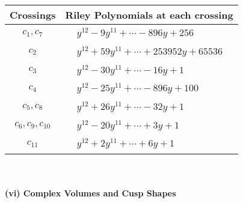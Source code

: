 \documentclass[1p]{elsarticle_modified}
\theoremstyle{definition}
\begin{document}
\begin{tabular}{m{50pt}|m{274pt}}
Crossings & \hspace{64pt}Riley Polynomials at each crossing \\
\hline $$\begin{aligned}c_{1},c_{7}\end{aligned}$$&$\begin{aligned}
&y^{12}-9 y^{11}+\cdots-896 y+256
\end{aligned}$\\
\hline $$\begin{aligned}c_{2}\end{aligned}$$&$\begin{aligned}
&y^{12}+59 y^{11}+\cdots+253952 y+65536
\end{aligned}$\\
\hline $$\begin{aligned}c_{3}\end{aligned}$$&$\begin{aligned}
&y^{12}-30 y^{11}+\cdots-16 y+1
\end{aligned}$\\
\hline $$\begin{aligned}c_{4}\end{aligned}$$&$\begin{aligned}
&y^{12}-25 y^{11}+\cdots-896 y+100
\end{aligned}$\\
\hline $$\begin{aligned}c_{5},c_{8}\end{aligned}$$&$\begin{aligned}
&y^{12}+26 y^{11}+\cdots-32 y+1
\end{aligned}$\\
\hline $$\begin{aligned}c_{6},c_{9},c_{10}\end{aligned}$$&$\begin{aligned}
&y^{12}-20 y^{11}+\cdots+3 y+1
\end{aligned}$\\
\hline $$\begin{aligned}c_{11}\end{aligned}$$&$\begin{aligned}
&y^{12}+2 y^{11}+\cdots+6 y+1
\end{aligned}$\\
\hline
\end{tabular}\\~\\
\newpage\flushleft \textbf{(vi) Complex Volumes and Cusp Shapes}
\end{document}

